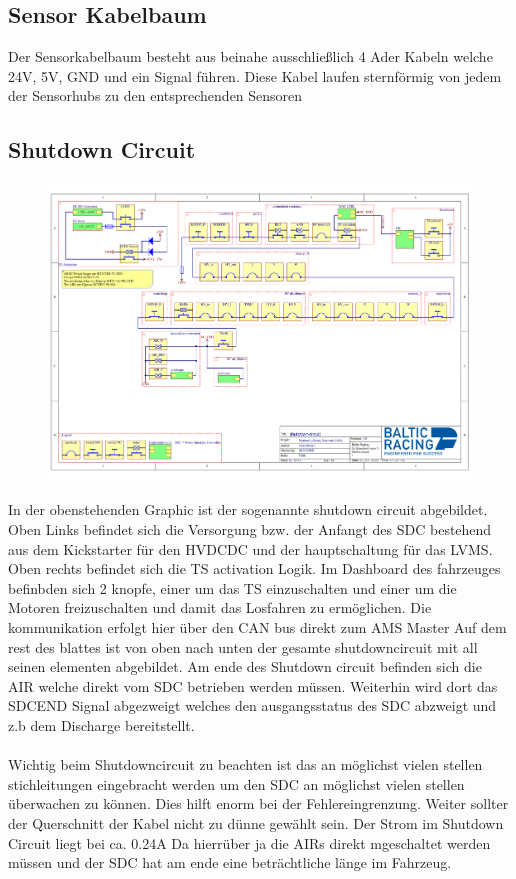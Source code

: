 \subsection{Sensor Kabelbaum}

Der Sensorkabelbaum besteht aus beinahe ausschließlich 4 Ader Kabeln welche 24V, 5V, GND und ein Signal führen. Diese Kabel laufen sternförmig von jedem der Sensorhubs zu den entsprechenden Sensoren

\subsection{Shutdown Circuit}
\begin{figure}[h]
	\centering
	\includegraphics[width=1\linewidth]{bilder/Shutdowncircuit}
	\caption[Shutdown Circuit Schematic]{}
	\label{fig:shutdowncircuit}
\end{figure}

In der obenstehenden Graphic ist der sogenannte shutdown circuit abgebildet. Oben Links befindet sich die Versorgung bzw. der Anfangt des SDC bestehend aus dem Kickstarter für den HVDCDC und der hauptschaltung für das LVMS. Oben rechts befindet sich die TS activation Logik. Im Dashboard des fahrzeuges befinbden sich 2 knopfe, einer um das TS einzuschalten und einer um die Motoren freizuschalten und damit das Losfahren zu ermöglichen. Die kommunikation erfolgt hier über den CAN bus direkt zum AMS Master Auf dem rest des blattes ist von oben nach unten der gesamte shutdowncircuit mit all seinen elementen abgebildet. Am ende des Shutdown circuit befinden sich die AIR welche direkt vom SDC betrieben werden müssen. Weiterhin wird dort das SDCEND Signal abgezweigt welches den ausgangsstatus des SDC abzweigt und z.b dem Discharge bereitstellt.\\
\\
Wichtig beim Shutdowncircuit zu beachten ist das an möglichst vielen stellen stichleitungen eingebracht werden um den SDC an möglichst vielen stellen überwachen zu können. Dies hilft enorm bei der Fehlereingrenzung. Weiter sollter der Querschnitt der Kabel nicht zu dünne gewählt sein. Der Strom im Shutdown Circuit liegt bei ca. 0.24A Da hierrüber ja die AIRs direkt mgeschaltet werden müssen und der SDC hat am ende eine beträchtliche länge im Fahrzeug. 

